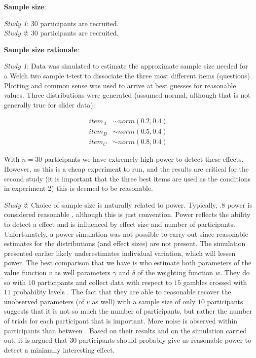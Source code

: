 \documentclass[12pt]{article}
\begin{document}
\textbf{Sample size}:

\emph{Study 1}: $30$ participants are recruited. \\

\emph{Study 2}: $30$ participants are recruited.

\textbf{Sample size rationale}:

\emph{Study 1}: Data was simulated to estimate the
approximate sample size needed for a Welch two
sample t-test to dissociate the three most
different items (questions). Plotting and common
sense was used to arrive at best guesses for
reasonable values. Three distributions were generated
(assumed normal, although that is not generally true
for slider data):

\begin{equation} \label{eq3}
\begin{split}
	item_A &\sim norm(0.2, 0.4) \\
	item_B &\sim norm(0.5, 0.4) \\
	item_C &\sim norm(0.8, 0.4)
\end{split}
\end{equation}

With $n = 30$ participants we have extremely
high power to detect these effects. However,
as this is a cheap experiment to run, and the
results are critical for the second study
(it is important that the three best items are
used as the conditions in experiment 2)
this is deemed to be reasonable.

\vspace{3mm}

\emph{Study 2}: Choice of sample
size is naturally related to
power. Typically, $.8$ power is considered reasonable
\autocite{cohen1992power},
although this is just convention. Power reflects the
ability to detect a effect and is influenced by
effect size and number of participants.
Unfortunately, a power simulation was not possible
to carry out since reasonable estimates for the
distributions (and effect sizes) are not present.
The simulation presented earlier likely underestimates
individual variation, which will lessen power.
The best comparison that we have is
\textcite{gonzalez1999shape} who estimate both
parameters of the value function $v$ as well
parameters $\gamma$ and  $\delta$ of the weighting
function  $w$. They do so with  $10$ participants and
collect data with respect to $15$ gambles crossed
with  $11$ probability levels \autocite{gonzalez1999shape}.
The fact that they are able to reasonable recover
the unobserved parameters (of  $v$ as well) with
a sample size of only $10$ participants suggests
that it is not so much the number of participants,
but rather the number of trials for each participant
that is important. More noise is observed within
participants than between \autocite{gonzalez1999shape}.
Based on their results and on the simulation carried
out, it is argued that $30$ participants should
probably give us reasonable power to detect a
minimally interesting effect.
\end{document}
